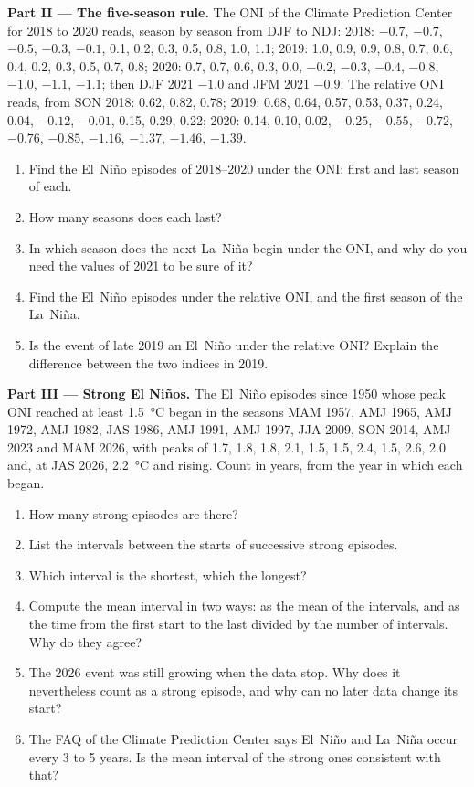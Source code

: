 \begin{problem}
\medskip\noindent\textbf{Part II --- The five-season rule.}
The ONI of the Climate Prediction Center for 2018 to 2020 reads, season by season from DJF to
NDJ: 2018: $-0.7$, $-0.7$, $-0.5$, $-0.3$, $-0.1$, 0.1, 0.2, 0.3, 0.5, 0.8, 1.0, 1.1; 2019: 1.0,
0.9, 0.9, 0.8, 0.7, 0.6, 0.4, 0.2, 0.3, 0.5, 0.7, 0.8; 2020: 0.7, 0.7, 0.6, 0.3, 0.0, $-0.2$,
$-0.3$, $-0.4$, $-0.8$, $-1.0$, $-1.1$, $-1.1$; then DJF 2021 $-1.0$ and JFM 2021 $-0.9$. The
relative ONI reads, from SON 2018: 0.62, 0.82, 0.78; 2019: 0.68, 0.64, 0.57, 0.53, 0.37, 0.24,
0.04, $-0.12$, $-0.01$, 0.15, 0.29, 0.22; 2020: 0.14, 0.10, 0.02, $-0.25$, $-0.55$, $-0.72$,
$-0.76$, $-0.85$, $-1.16$, $-1.37$, $-1.46$, $-1.39$.
\begin{enumerate}[resume]
  \item Find the El~Niño episodes of 2018--2020 under the ONI: first and last season of each.
  \item How many seasons does each last?
  \item In which season does the next La~Niña begin under the ONI, and why do you need the
        values of 2021 to be sure of it?
  \item Find the El~Niño episodes under the relative ONI, and the first season of the La~Niña.
  \item Is the event of late 2019 an El~Niño under the relative ONI? Explain the difference
        between the two indices in 2019.
\end{enumerate}

\medskip\noindent\textbf{Part III --- Strong El Niños.}
The El~Niño episodes since 1950 whose peak ONI reached at least \qty{1.5}{\celsius} began in the
seasons MAM 1957, AMJ 1965, AMJ 1972, AMJ 1982, JAS 1986, AMJ 1991, AMJ 1997, JJA 2009, SON 2014,
AMJ 2023 and MAM 2026, with peaks of 1.7, 1.8, 1.8, 2.1, 1.5, 1.5, 2.4, 1.5, 2.6, 2.0 and, at
JAS 2026, \qty{2.2}{\celsius} and rising. Count in years, from the year in which each began.
\begin{enumerate}[resume]
  \item How many strong episodes are there?
  \item List the intervals between the starts of successive strong episodes.
  \item Which interval is the shortest, which the longest?
  \item Compute the mean interval in two ways: as the mean of the intervals, and as the time
        from the first start to the last divided by the number of intervals. Why do they agree?
  \item The 2026 event was still growing when the data stop. Why does it nevertheless count
        as a strong episode, and why can no later data change its start?
  \item The FAQ of the Climate Prediction Center says El~Niño and La~Niña occur every 3 to 5
        years. Is the mean interval of the strong ones consistent with that?
\end{enumerate}


\end{problem}
